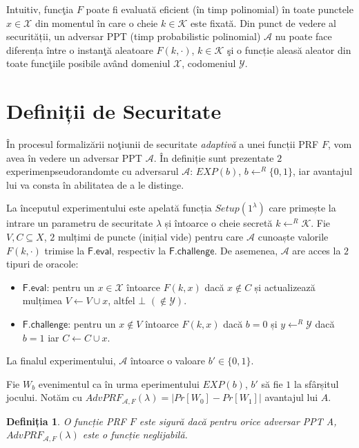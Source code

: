 \documentclass[oneside, 12pt]{book}
\newtheorem{definitie}{\textbf{Definiția}}[section]
\begin{document}
Intuitiv, funcţia $F$ poate fi evaluată eficient (în timp polinomial) în toate punctele $x \in \mathcal{X}$ din momentul în care o cheie $k \in \mathcal{K}$ este fixată. 
Din punct de vedere al securității, un adversar PPT (timp probabilistic polinomial) $\mathcal{A}$ nu poate face diferența între o instanţă aleatoare $F(k, \cdot)$, $k \in \mathcal{K}$ şi o funcție aleasă aleator din toate funcţiile posibile având domeniul $\mathcal{X}$, codomeniul $\mathcal{Y}$.


\section{Definiții de Securitate}
\label{subsec:prf-security}

În procesul formalizării noţiunii de securitate \textit{adaptivă} a unei funcții PRF $F$, vom avea în vedere un adversar PPT $\mathcal{A}$. În definiție sunt prezentate $2$ experimenpseudorandomte cu adversarul $\mathcal{A}$: $EXP(b)$, $b \leftarrow ^ R \{0,1\}$, iar avantajul lui va consta în abilitatea de a le distinge. 

La începutul experimentului este apelată funcția $Setup(1^\lambda)$ care primește la intrare un parametru de securitate $\lambda$ și întoarce o cheie secretă $k \leftarrow^R \mathcal{K}$. Fie $V, C \subseteq X$, $2$ mulțimi de puncte (inițial vide) pentru care $\mathcal{A}$ cunoaște valorile $F(k, \cdot)$ trimise la $\mathsf{F.eval}$, respectiv la $\mathsf{F.challenge}$. De asemenea, $\mathcal{A}$ are acces la $2$ tipuri de oracole:
\begin{itemize}
	\item $\mathsf{F.eval}$: pentru un $x \in \mathcal{X}$ întoarce $F(k, x)$ dacă $x \not \in C$ și actualizează mulțimea $V \leftarrow V \cup x$, altfel $\bot$ $(\not \in \mathcal{Y})$.
	\item $\mathsf{F.challenge}$: pentru un $x \not \in V$ întoarce $F(k, x)$ dacă $b = 0$ și $y \leftarrow^R \mathcal{Y}$ dacă $b = 1$ iar $C \leftarrow C \cup x$. 
\end{itemize}
La finalul experimentului, $\mathcal{A}$ întoarce o valoare $b' \in \{0, 1\}$.

Fie $W_b$ evenimentul ca în urma eperimentului $EXP(b)$, $b'$ să fie $1$ la sfârșitul jocului. Notăm cu $AdvPRF_{\mathcal{A},F}(\lambda) = |Pr[W_0] - Pr[W_1]|$ avantajul lui $A$.
\\
\begin{definitie}
	O funcție PRF $F$ este sigură dacă pentru orice adversar PPT A, $AdvPRF_{\mathcal{A},F}(\lambda)$ este o funcție neglijabilă.
\end{definitie}
\end{document}
